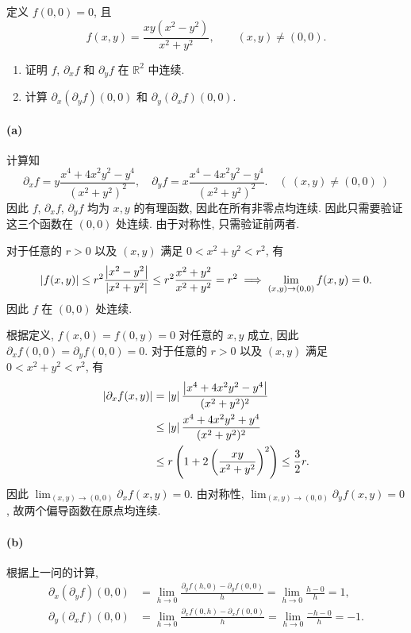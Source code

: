 \documentclass{article}
\begin{document}
\begin{problem}
  定义 $f(0,0)=0$, 且
  \[
    f(x,y)=\frac{xy(x^2-y^2)}{x^2+y^2},\qquad (x,y)\neq(0,0).
  \]
  \begin{enumerate}
    \item[(a)] 证明 $f$, $\partial_x f$ 和 $\partial_y f$ 在 $\mathbb{R}^2$ 中连续.
    \item[(b)] 计算 $\partial_x(\partial_y f)(0,0)$ 和 $\partial_y(\partial_x f)(0,0)$.
  \end{enumerate}
\end{problem}

\begin{solution}
	\paragraph{(a)} 计算知
	\[ \partial_x f = y \frac{x^4 + 4x^2 y^2 - y^4}{(x^2+y^2)^2}, \quad 
	\partial_y f = x \frac{x^4 - 4x^2 y^2 - y^4}{(x^2+y^2)^2}. \quad
	(\ (x,y) \neq (0,0)\ ) \]
	因此 $f$, $\partial_xf$, $\partial_y f$ 均为 $x, y$ 的有理函数, 因此在所有非零点均连续. 因此只需要验证这三个函数在 $(0, 0)$ 处连续. 由于对称性, 只需验证前两者.

	对于任意的 $r>0$ 以及 $(x,y)$ 满足 $0 < x^2+y^2 < r^2$, 有
	\[ \left|f(x,y)\right| \le r^2 \frac{\left|x^2 - y^2\right|}{\left|x^2 + y^2\right|}
	\le r^2 \frac{x^2 + y^2}{x^2 + y^2} =r^2
	\implies \lim_{(x,y) \to (0,0)} f(x,y) = 0. \]
	因此 $f$ 在 $(0,0)$ 处连续. 
	
	根据定义, $f(x,0) = f(0,y) = 0$ 对任意的 $x,y$ 成立, 因此 $\partial_xf(0,0) = \partial_yf(0,0) = 0$. 对于任意的 $r>0$ 以及 $(x,y)$ 满足 $0 < x^2+y^2 < r^2$, 有
	\begin{align*}
		\left|\partial_x f(x,y)\right|
		&= \left|y\right|\frac{\left|x^4 + 4x^2 y^2 - y^4\right|}{(x^2+y^2)^2} \\
		&\le \left|y\right|\frac{x^4 + 4x^2 y^2 + y^4}{(x^2+y^2)^2} \\
		&\le r \left( 1 + 2\left( \frac{xy}{x^2+y^2} \right)^2 \right)
		\le \frac{3}{2}r.
	\end{align*}
	因此 $\lim_{(x,y) \to (0,0)} \partial_x f(x,y) = 0$. 由对称性, $\lim_{(x,y) \to (0,0)} \partial_y f(x,y) = 0$, 故两个偏导函数在原点均连续.

	\paragraph{(b)} 根据上一问的计算, 
	\begin{align*}
		\partial_x(\partial_yf)(0,0)
		&= \lim_{h \to 0}\frac{\partial_yf(h,0) - \partial_yf(0,0)}{h}
		= \lim_{h \to 0} \frac{h-0}{h} = 1, \\
		\partial_y(\partial_xf)(0,0)
		&= \lim_{h \to 0}\frac{\partial_xf(0,h) - \partial_xf(0,0)}{h}
		= \lim_{h \to 0} \frac{-h-0}{h} = -1. 
	\end{align*}
\end{solution}
\end{document}
